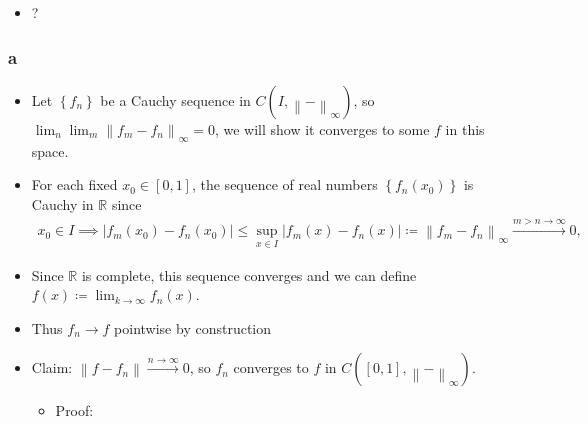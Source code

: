 \begin{solution}

\hfill

\begin{concept}

\hfill

\begin{itemize}
\tightlist
\item
  ?
\end{itemize}

\end{concept}

\hypertarget{a-18}{%
\subsubsection{a}\label{a-18}}

\begin{itemize}
\item
  Let \(\left\{{f_n}\right\}\) be a Cauchy sequence in
  \(C(I, {\left\lVert {{-}} \right\rVert}_\infty)\), so
  \(\lim_n\lim_m {\left\lVert {f_m - f_n} \right\rVert}_\infty = 0\), we
  will show it converges to some \(f\) in this space.
\item
  For each fixed \(x_0 \in [0, 1]\), the sequence of real numbers
  \(\left\{{f_n(x_0)}\right\}\) is Cauchy in \({\mathbb{R}}\) since
  \begin{align*}
  x_0\in I \implies {\left\lvert {f_m(x_0) - f_n(x_0)} \right\rvert} \leq \sup_{x\in I} {\left\lvert {f_m(x) - f_n(x)} \right\rvert} \coloneqq{\left\lVert {f_m - f_n} \right\rVert}_\infty \overset{m>n\to\infty}\to 0,
  \end{align*}
\item
  Since \({\mathbb{R}}\) is complete, this sequence converges and we can
  define \(f(x) \coloneqq\lim_{k\to \infty} f_n(x)\).
\item
  Thus \(f_n\to f\) pointwise by construction
\item
  Claim:
  \({\left\lVert {f - f_n} \right\rVert} \overset{n\to\infty}\to 0\), so
  \(f_n\) converges to \(f\) in
  \(C([0, 1], {\left\lVert {{-}} \right\rVert}_\infty)\).

  \begin{itemize}
  \tightlist
  \item
    Proof:


\end{itemize}
\end{itemize}
\end{solution}
